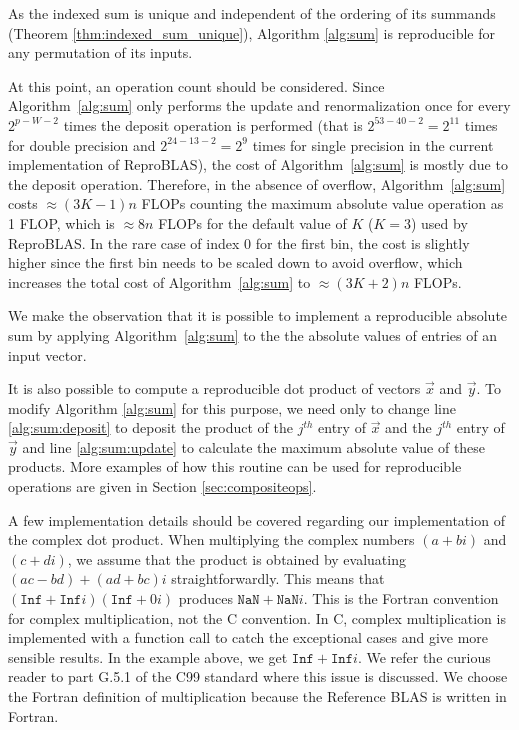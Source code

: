     As the indexed sum is unique and independent of the ordering of its summands (Theorem \ref{thm:indexed_sum_unique}), Algorithm \ref{alg:sum} is reproducible for any permutation of its inputs.

    At this point, an operation count should be considered. Since Algorithm~\ref{alg:sum} only performs the update and renormalization
  once for every $2^{p-W-2}$ times the deposit operation is performed (that
is $2^{53-40-2}=2^{11}$ times for double precision and $2^{24-13-2} = 2^9$ times for single precision in the current implementation of
  ReproBLAS), the cost of Algorithm~\ref{alg:sum} is mostly due to the
  deposit operation.
  Therefore, in the absence of overflow, Algorithm~\ref{alg:sum} costs
  $\approx (3K-1)n$ FLOPs counting the maximum absolute value operation as 1 FLOP,
  which is $\approx 8n$ FLOPs for the default value of $K$ ($K=3$) used by ReproBLAS.
  In the rare case of index 0 for the first bin,
  the cost is slightly higher since the first bin
  needs to be scaled down to avoid overflow, which increases the
  total cost of Algorithm~\ref{alg:sum} to $\approx (3K+2)n$ FLOPs.

  We make the observation that it is possible to implement a reproducible absolute sum by applying Algorithm~\ref{alg:sum} to the the absolute values of entries of an input vector.

  It is also possible to compute a reproducible dot product of vectors $\vec{x}$ and $\vec{y}$. To modify Algorithm \ref{alg:sum} for this purpose, we need only to change line  \ref{alg:sum:deposit} to deposit the product of the $j^{th}$ entry of $\vec{x}$ and the $j^{th}$ entry of $\vec{y}$ and line \ref{alg:sum:update} to calculate the maximum absolute value of these products. More examples of how this routine can be used for reproducible operations are given in Section \ref{sec:compositeops}.

  A few implementation details should be covered regarding our implementation
  of the complex dot product. When multiplying the complex numbers $(a + bi)$ and
  $(c + di)$, we assume that the product is obtained by evaluating $(ac - bd) +
  (ad + bc)i$ straightforwardly. This means that $(\texttt{Inf} +
  \texttt{Inf}i)(\texttt{Inf} + 0i)$ produces $\texttt{NaN} + \texttt{NaN}i$.
  This is the Fortran convention for complex multiplication, not the C
  convention. In C, complex multiplication is implemented with a function call to
  catch the exceptional cases and give more sensible results. In the example
  above, we get $\texttt{Inf} + \texttt{Inf}i$. We refer the curious reader to
  part G.5.1 of the C99 standard \cite{c99} where this issue is discussed. We
  choose the Fortran definition of multiplication because the Reference BLAS is
  written in Fortran.
